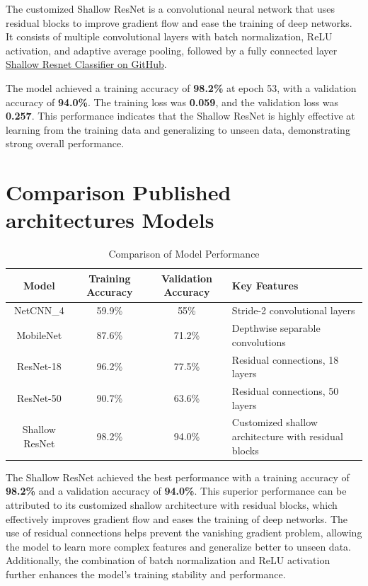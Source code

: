 \documentclass[12pt]{article}
\begin{document}
The customized Shallow ResNet is a convolutional neural network that uses residual blocks to improve gradient flow and ease the training of deep networks. It consists of multiple convolutional layers with batch normalization, ReLU activation, and adaptive average pooling, followed by a fully connected layer \href{https://github.com/XavierSpycy/EMNIST-Classifier/tree/main?tab=readme-ov-file&fbclid=IwZXh0bgNhZW0CMTEAAR28TUMKmsi-__lqn5Kghur0N787OLz2i_F1VS9roCK0PDzmlKxDdLlqj3A_aem_w7o4e13T9U_QePSc0L5I3Q#sparkles-6-pre-training--fine-tuning}{Shallow Resnet Classifier on GitHub}.

The model achieved a training accuracy of \textbf{98.2\%} at epoch 53, with a validation accuracy of \textbf{94.0\%}. The training loss was \textbf{0.059}, and the validation loss was \textbf{0.257}. This performance indicates that the Shallow ResNet is highly effective at learning from the training data and generalizing to unseen data, demonstrating strong overall performance.

\section*{Comparison Published architectures Models}


\begin{table}[ht]
    \centering
    \begin{tabular}{|c|c|c|p{6cm}|}
        \hline
        \textbf{Model} & \textbf{Training Accuracy} & \textbf{Validation Accuracy} & \textbf{Key Features} \\
        \hline
        NetCNN\_4 & 59.9\% & 55\% & Stride-2 convolutional layers \\
        \hline
        MobileNet & 87.6\% & 71.2\% & Depthwise separable convolutions \\
        \hline
        ResNet-18 & 96.2\% & 77.5\% & Residual connections, 18 layers \\
        \hline
        ResNet-50 & 90.7\% & 63.6\% & Residual connections, 50 layers \\
        \hline
        Shallow ResNet & 98.2\% & 94.0\% & Customized shallow architecture with residual blocks \\
        \hline
    \end{tabular}
    \caption{Comparison of Model Performance}
    \label{tab:model_comparison}
\end{table}

The Shallow ResNet achieved the best performance with a training accuracy of \textbf{98.2\%} and a validation accuracy of \textbf{94.0\%}. This superior performance can be attributed to its customized shallow architecture with residual blocks, which effectively improves gradient flow and eases the training of deep networks. The use of residual connections helps prevent the vanishing gradient problem, allowing the model to learn more complex features and generalize better to unseen data. Additionally, the combination of batch normalization and ReLU activation further enhances the model's training stability and performance.
\end{document}

